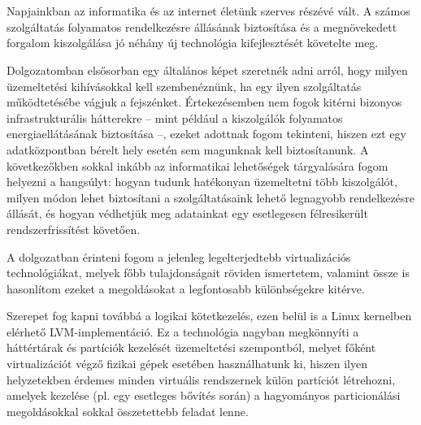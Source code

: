 \chapter{\bevezetes}

%

Napjainkban az informatika és az internet életünk szerves részévé vált. A számos szolgáltatás folyamatos rendelkezésre állásának biztosítása és a megnövekedett forgalom kiszolgálása jó néhány új technológia kifejlesztését követelte meg.

Dolgozatomban elsősorban egy általános képet szeretnék adni arról, hogy milyen üzemeltetési kihívásokkal kell szembenéznünk, ha egy ilyen szolgáltatás működtetésébe vágjuk a fejszénket. Értekezésemben nem fogok kitérni bizonyos infrastrukturális hátterekre -- mint például a kiszolgálók folyamatos energiaellátásának biztosítása --, ezeket adottnak fogom tekinteni, hiszen ezt egy adatközpontban bérelt hely esetén sem magunknak kell biztosítanunk. A következőkben sokkal inkább az informatikai lehetőségek tárgyalására fogom helyezni a hangsúlyt: hogyan tudunk hatékonyan üzemeltetni több kiszolgálót, milyen módon lehet biztosítani a szolgáltatásaink lehető legnagyobb rendelkezésre állását, és hogyan védhetjük meg adatainkat egy esetlegesen félresikerült rendszerfrissítést követően.

A dolgozatban érinteni fogom a jelenleg legelterjedtebb virtualizációs technológiákat, melyek főbb tulajdonságait röviden ismertetem, valamint össze is hasonlítom ezeket a megoldásokat a legfontosabb különbségekre kitérve.

Szerepet fog kapni továbbá a logikai kötetkezelés, ezen belül is a Linux kernelben elérhető LVM-implementáció. Ez a technológia nagyban megkönnyíti a háttértárak és partíciók kezelését üzemeltetési szempontból, melyet főként virtualizációt végző fizikai gépek esetében használhatunk ki, hiszen ilyen helyzetekben érdemes minden virtuális rendszernek külön partíciót létrehozni, amelyek kezelése (pl. egy esetleges bővítés során) a hagyományos particionálási megoldásokkal sokkal összetettebb feladat lenne.

